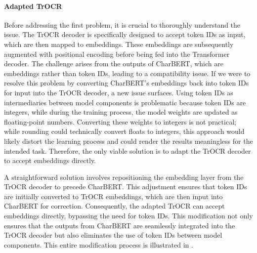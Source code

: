\paragraph*{Adapted TrOCR}
\label{par:3_adapted_trocr}
Before addressing the first problem, it is crucial to thoroughly understand the issue. The TrOCR decoder is specifically designed to accept token IDs as input, which are then mapped to embeddings. These embeddings are subsequently augmented with positional encoding before being fed into the Transformer decoder. The challenge arises from the outputs of CharBERT, which are embeddings rather than token IDs, leading to a compatibility issue. If we were to resolve this problem by converting CharBERT's embeddings back into token IDs for input into the TrOCR decoder, a new issue surfaces. Using token IDs as intermediaries between model components is problematic because token IDs are integers, while during the training process, the model weights are updated as floating-point numbers. Converting these weights to integers is not practical; while rounding could technically convert floats to integers, this approach would likely distort the learning process and could render the results meaningless for the intended task. Therefore, the only viable solution is to adapt the TrOCR decoder to accept embeddings directly.

A straightforward solution involves repositioning the embedding layer from the TrOCR decoder to precede CharBERT. This adjustment ensures that token IDs are initially converted to TrOCR embeddings, which are then input into CharBERT for correction. Consequently, the adapted TrOCR can accept embeddings directly, bypassing the need for token IDs. This modification not only ensures that the outputs from CharBERT are seamlessly integrated into the TrOCR decoder but also eliminates the use of token IDs between model components. This entire modification process is illustrated in . 



